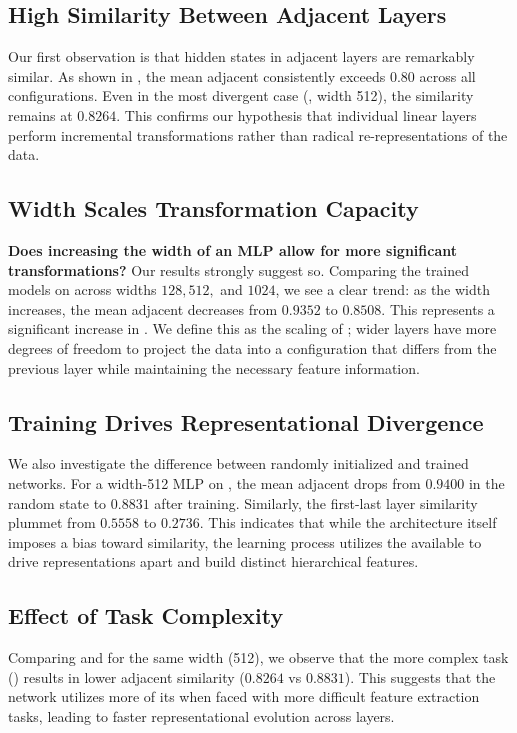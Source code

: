 \subsection{High Similarity Between Adjacent Layers}
Our first observation is that hidden states in adjacent layers are remarkably similar. As shown in , the mean adjacent \cka consistently exceeds $0.80$ across all configurations. Even in the most divergent case (\dscifar, width 512), the similarity remains at $0.8264$. This confirms our hypothesis that individual linear layers perform incremental transformations rather than radical re-representations of the data.

\subsection{Width Scales Transformation Capacity}
{\bf Does increasing the width of an MLP allow for more significant transformations?} Our results strongly suggest so. Comparing the trained models on \mnist across widths $128, 512,$ and $1024$, we see a clear trend: as the width increases, the mean adjacent \cka decreases from $0.9352$ to $0.8508$. This represents a significant increase in \repdiv. We define this as the scaling of \transcap; wider layers have more degrees of freedom to project the data into a configuration that differs from the previous layer while maintaining the necessary feature information.

\subsection{Training Drives Representational Divergence}
We also investigate the difference between randomly initialized and trained networks. For a width-512 MLP on \mnist, the mean adjacent \cka drops from $0.9400$ in the random state to $0.8831$ after training. Similarly, the first-last layer similarity plummet from $0.5558$ to $0.2736$. This indicates that while the architecture itself imposes a bias toward similarity, the learning process utilizes the available \transcap to drive representations apart and build distinct hierarchical features.

\subsection{Effect of Task Complexity}
Comparing \dsmnist and \dscifar for the same width (512), we observe that the more complex task (\dscifar) results in lower adjacent similarity ($0.8264$ vs $0.8831$). This suggests that the network utilizes more of its \transcap when faced with more difficult feature extraction tasks, leading to faster representational evolution across layers.

